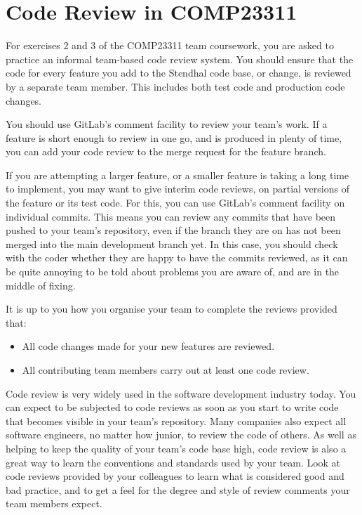 \documentclass[
]{book}
\providecommand{\tightlist}{%
  \setlength{\itemsep}{0pt}\setlength{\parskip}{0pt}}
\begin{document}
\hypertarget{crcourse}{%
\section{Code Review in COMP23311}\label{crcourse}}

For exercises 2 and 3 of the COMP23311 team coursework, you are asked to practice an informal team-based code review system. You should ensure that the code for every feature you add to the Stendhal code base, or change, is reviewed by a separate team member. This includes both test code and production code changes.

You should use GitLab's comment facility to review your team's work. If a feature is short enough to review in one go, and is produced in plenty of time, you can add your code review to the merge request for the feature branch.

If you are attempting a larger feature, or a smaller feature is taking a long time to implement, you may want to give interim code reviews, on partial versions of the feature or its test code. For this, you can use GitLab's comment facility on individual commits. This means you can review any commits that have been pushed to your team's repository, even if the branch they are on has not been merged into the main development branch yet. In this case, you should check with the coder whether they are happy to have the commits reviewed, as it can be quite annoying to be told about problems you are aware of, and are in the middle of fixing.

It is up to you how you organise your team to complete the reviews provided that:

\begin{itemize}
\tightlist
\item
  All code changes made for your new features are reviewed.
\item
  All contributing team members carry out at least one code review.
\end{itemize}

Code review is very widely used in the software development industry today. You can expect to be subjected to code reviews as soon as you start to write code that becomes visible in your team's repository. Many companies also expect all software engineers, no matter how junior, to review the code of others. As well as helping to keep the quality of your team's code base high, code review is also a great way to learn the conventions and standards used by your team. Look at code reviews provided by your colleagues to learn what is considered good and bad practice, and to get a feel for the degree and style of review comments your team members expect.
\end{document}
